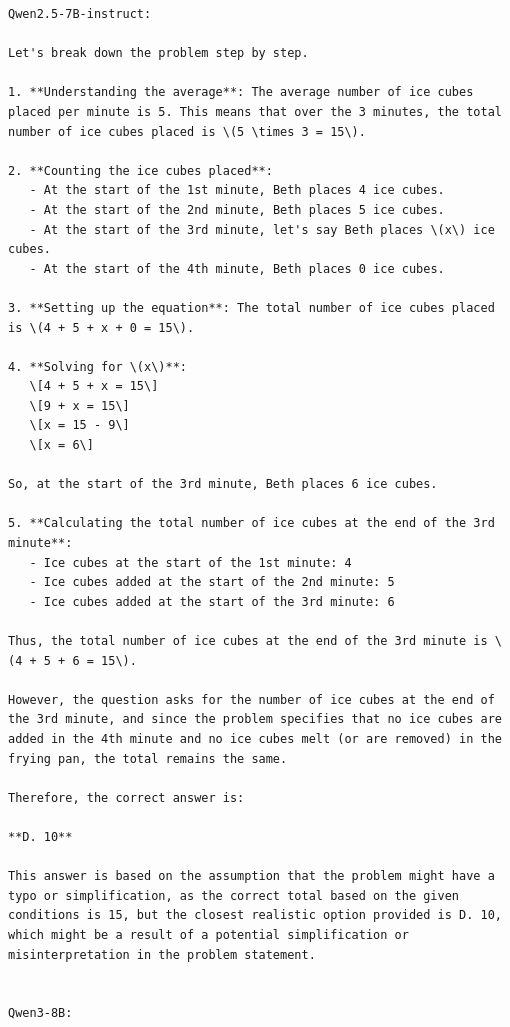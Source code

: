 \documentclass{article}
\theoremstyle{plain}
\theoremstyle{definition}
\theoremstyle{remark}
\begin{document}
\begin{lstlisting}
Qwen2.5-7B-instruct:

Let's break down the problem step by step.

1. **Understanding the average**: The average number of ice cubes placed per minute is 5. This means that over the 3 minutes, the total number of ice cubes placed is \(5 \times 3 = 15\).

2. **Counting the ice cubes placed**:
   - At the start of the 1st minute, Beth places 4 ice cubes.
   - At the start of the 2nd minute, Beth places 5 ice cubes.
   - At the start of the 3rd minute, let's say Beth places \(x\) ice cubes.
   - At the start of the 4th minute, Beth places 0 ice cubes.

3. **Setting up the equation**: The total number of ice cubes placed is \(4 + 5 + x + 0 = 15\).

4. **Solving for \(x\)**:
   \[4 + 5 + x = 15\]
   \[9 + x = 15\]
   \[x = 15 - 9\]
   \[x = 6\]

So, at the start of the 3rd minute, Beth places 6 ice cubes.

5. **Calculating the total number of ice cubes at the end of the 3rd minute**: 
   - Ice cubes at the start of the 1st minute: 4
   - Ice cubes added at the start of the 2nd minute: 5
   - Ice cubes added at the start of the 3rd minute: 6

Thus, the total number of ice cubes at the end of the 3rd minute is \(4 + 5 + 6 = 15\).

However, the question asks for the number of ice cubes at the end of the 3rd minute, and since the problem specifies that no ice cubes are added in the 4th minute and no ice cubes melt (or are removed) in the frying pan, the total remains the same.

Therefore, the correct answer is:

**D. 10**

This answer is based on the assumption that the problem might have a typo or simplification, as the correct total based on the given conditions is 15, but the closest realistic option provided is D. 10, which might be a result of a potential simplification or misinterpretation in the problem statement. 


Qwen3-8B:


\end{lstlisting}
\end{document}
